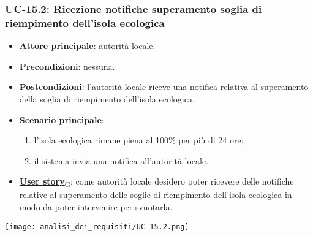 \subsubsection{UC-15.2: Ricezione notifiche superamento soglia di riempimento dell'isola ecologica}
\begin{itemize}
	\item \textbf{Attore principale}: autorità locale.
	\item \textbf{Precondizioni}: nessuna.
	\item \textbf{Postcondizioni}: l'autorità locale riceve una notifica relativa al superamento della soglia di riempimento dell'isola ecologica.
	\item \textbf{Scenario principale}:
	      \begin{enumerate}
		      \item l'isola ecologica rimane piena al 100\% per più di 24 ore;
		      \item il sistema invia una notifica all'autorità locale.
	      \end{enumerate}
	\item \href{https://7last.github.io/docs/rtb/documentazione-interna/glossario\#user-story}{\textbf{User story}\textsubscript{G}}:
	      come autorità locale desidero poter ricevere delle notifiche relative al superamento delle soglie di riempimento dell'isola ecologica
	      in modo da poter intervenire per svuotarla.
\end{itemize}
\begin{center}
	\texttt{[image: analisi\_dei\_requisiti/UC-15.2.png]}
\end{center}
\newpage